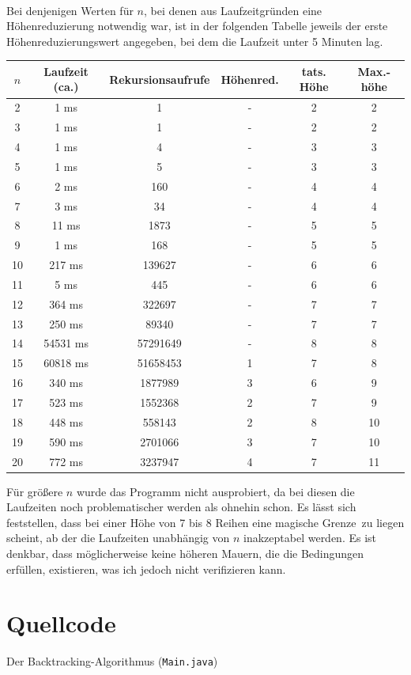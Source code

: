 \documentclass[a4paper, notitlepage, 12pt]{scrartcl}
\newenvironment{longlisting}{\captionsetup{type=listing}}{}
\begin{document}
\begin{center}
\begin{Verbatim}
  
 \end{Verbatim}
 \end{center}
 Bei denjenigen Werten für $n$, bei denen  aus Laufzeitgründen eine Höhenreduzierung notwendig war, ist in der folgenden Tabelle jeweils der erste Höhenreduzierungswert angegeben, bei dem die Laufzeit unter 5 Minuten lag.
 \begin{center}
 \begin{tabular}{|c|c|c|c|c|c|}
  \hline
 $n$ & Laufzeit (ca.) & Rekursionsaufrufe & Höhenred. & tats. Höhe & Max.-höhe \\ \hline
2 & 1 ms & 1 & - & 2& 2\\
3 & 1 ms & 1 & - & 2& 2\\
4 & 1 ms & 4 & - & 3& 3\\
5 & 1 ms & 5 & - & 3& 3\\
6 & 2 ms & 160 & - &4 & 4\\
7 & 3 ms & 34 & - & 4& 4\\
8 & 11 ms & 1873 & - &5 & 5\\
9 & 1 ms & 168 & - & 5& 5\\
10 & 217 ms & 139627 & - &6 & 6\\
11 & 5 ms & 445 & - & 6& 6\\
12 & 364 ms & 322697 & - & 7& 7\\
13 & 250 ms & 89340 & - & 7& 7\\
14 & 54531 ms & 57291649 & - &8 & 8\\ \hline \hline
15 & 60818 ms & 51658453 & 1 & 7& 8\\
16 & 340 ms & 1877989 & 3 & 6& 9\\
17 & 523 ms & 1552368 & 2 & 7& 9\\
18 & 448 ms & 558143 & 2 & 8& 10\\
19 & 590 ms & 2701066 & 3 & 7& 10\\
20 & 772 ms & 3237947 & 4 & 7& 11\\ \hline
 \end{tabular}
 \end{center}
 Für größere $n$ wurde das Programm nicht ausprobiert, da bei diesen die Laufzeiten noch problematischer werden als ohnehin schon. Es lässt sich feststellen, dass bei einer Höhe von 7 bis 8 Reihen eine \glqq magische Grenze\grqq ~zu liegen scheint, ab der die Laufzeiten unabhängig von $n$ inakzeptabel werden. Es ist denkbar, dass möglicherweise keine höheren Mauern, die die Bedingungen erfüllen, existieren, was ich jedoch nicht verifizieren kann.
 \section{Quellcode}
 \renewcommand{\listingscaption}{Quellcode}
 
 \begin{longlisting}
 \caption{Der Backtracking-Algorithmus (\texttt{Main.java})}
 \end{longlisting}
 
 
\end{document}

